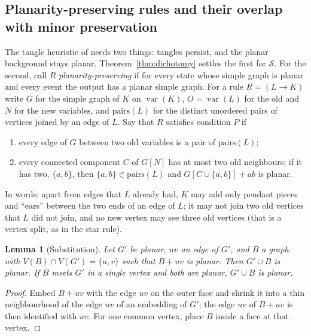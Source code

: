 \documentclass[10pt]{article}
\theoremstyle{definition}
\theoremstyle{plain}
\newtheorem{lemma}[theorem]{Lemma}
\theoremstyle{remark}
\DeclareMathOperator{\var}{var}
\begin{document}
\subsection{Planarity-preserving rules and their overlap with minor preservation}\label{sec:planarity}
The tangle heuristic of \citet[\S2.4]{gorard2020relativistic} needs two things: tangles persist, and the planar background stays planar. Theorem~\ref{thm:dichotomy} settles the first for $\mathcal S$. For the second, call $R$ \emph{planarity-preserving} if for every state whose simple graph is planar and every event the output has a planar simple graph. For a rule $R=(L\to K)$ write $G$ for the simple graph of $K$ on $\var(K)$, $O=\var(L)$ for the old and $N$ for the new variables, and $\mathrm{pairs}(L)$ for the distinct unordered pairs of vertices joined by an edge of $L$. Say that $R$ satisfies condition $P$ if
\begin{enumerate}
\item[(P1)] every edge of $G$ between two old variables is a pair of $\mathrm{pairs}(L)$;
\item[(P2)] every connected component $C$ of $G[N]$ has at most two old neighbours; if it has two, $\{a,b\}$, then $\{a,b\}\in\mathrm{pairs}(L)$ and $G[C\cup\{a,b\}]+ab$ is planar.
\end{enumerate}
In words: apart from edges that $L$ already had, $K$ may add only pendant pieces and ``ears'' between the two ends of an edge of $L$; it may not join two old vertices that $L$ did not join, and no new vertex may see three old vertices (that is a vertex split, as in the star rule).

\begin{lemma}[Substitution]\label{lem:subst}
Let $G'$ be planar, $uv$ an edge of $G'$, and $B$ a graph with $V(B)\cap V(G')=\{u,v\}$ such that $B+uv$ is planar. Then $G'\cup B$ is planar. If $B$ meets $G'$ in a single vertex and both are planar, $G'\cup B$ is planar.
\end{lemma}
\begin{proof}
Embed $B+uv$ with the edge $uv$ on the outer face and shrink it into a thin neighbourhood of the edge $uv$ of an embedding of $G'$; the edge $uv$ of $B+uv$ is then identified with $uv$. For one common vertex, place $B$ inside a face at that vertex.
\end{proof}
\end{document}
